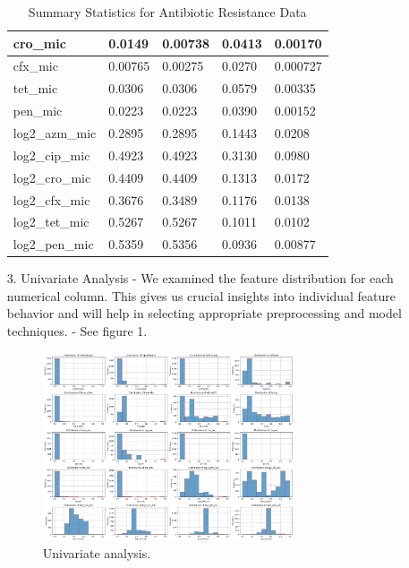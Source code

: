 \documentclass[manuscript,screen,review, nonacm]{acmart}
\begin{document}
\begin{itemize}
\begin{table}[H]
\begin{tabular}{|l|l|l|l|l|}
        cro\_mic              & 0.0149           & 0.00738          & 0.0413           & 0.00170           \\ \hline
        cfx\_mic              & 0.00765          & 0.00275          & 0.0270           & 0.000727          \\ \hline
        tet\_mic              & 0.0306           & 0.0306           & 0.0579           & 0.00335           \\ \hline
        pen\_mic              & 0.0223           & 0.0223           & 0.0390           & 0.00152           \\ \hline
        log2\_azm\_mic        & 0.2895           & 0.2895           & 0.1443           & 0.0208            \\ \hline
        log2\_cip\_mic        & 0.4923           & 0.4923           & 0.3130           & 0.0980            \\ \hline
        log2\_cro\_mic        & 0.4409           & 0.4409           & 0.1313           & 0.0172            \\ \hline
        log2\_cfx\_mic        & 0.3676           & 0.3489           & 0.1176           & 0.0138            \\ \hline
        log2\_tet\_mic        & 0.5267           & 0.5267           & 0.1011           & 0.0102            \\ \hline
        log2\_pen\_mic        & 0.5359           & 0.5356           & 0.0936           & 0.00877           \\ \hline
        \end{tabular}
        \caption{Summary Statistics for Antibiotic Resistance Data}
    \end{table}
    \item[3.] Univariate Analysis - We examined the feature distribution for each numerical column. This gives us crucial insights into individual feature behavior 
    and will help in selecting appropriate preprocessing and model techniques. - See figure 1.
            \begin{figure}[H]
                \centering
                \vspace{-10pt}
                \includegraphics[width=0.7\textwidth]{figures/univar.png}
                \caption{Univariate analysis.}
                \vspace{-10pt}
            \end{figure}


\end{itemize}
\end{document}
